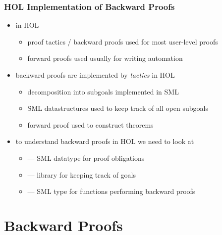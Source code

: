 \begin{frame}
\frametitle{HOL Implementation of Backward Proofs}
\begin{itemize}
\item in HOL
\begin{itemize}
\item proof tactics / backward proofs used for most user-level proofs
\item forward proofs used usually for writing automation
\end{itemize}
\item backward proofs are implemented by \emph{tactics} in HOL
\begin{itemize}
\item decomposition into subgoals implemented in SML
\item SML datastructures used to keep track of all open subgoals
\item forward proof used to construct theorems
\end{itemize}
\item to understand backward proofs in HOL we need to look at
\begin{itemize}
\item {} --- SML datatype for proof obligations
\item {} --- library for keeping track of goals
\item {} --- SML type for functions performing backward proofs
\end{itemize}
\end{itemize}
\end{frame}


\section{Backward Proofs}

